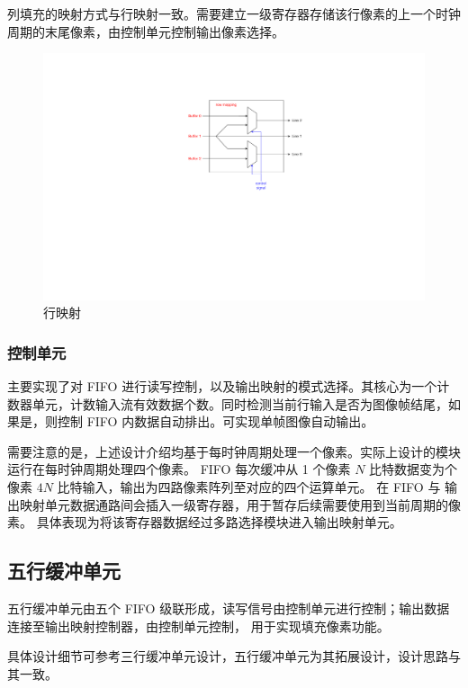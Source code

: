 \documentclass[12pt, a4paper, oneside]{ctexbook}
\begin{document}
	列填充的映射方式与行映射一致。需要建立一级寄存器存储该行像素的上一个时钟周期的末尾像素，由控制单元控制输出像素选择。
		\begin{figure}[h]
		\centering
		\includegraphics[scale=1]{pic/row_mapping.pdf}
		\caption{行映射}
		\end{figure}	
	\subsubsection{控制单元}
	主要实现了对 FIFO 进行读写控制，以及输出映射的模式选择。其核心为一个计数器单元，计数输入流有效数据个数。同时检测当前行输入是否为图像帧结尾，如果是，则控制 FIFO 内数据自动排出。可实现单帧图像自动输出。
	\par 需要注意的是，上述设计介绍均基于每时钟周期处理一个像素。实际上设计的模块运行在每时钟周期处理四个像素。
	FIFO 每次缓冲从 1 个像素 $N$ 比特数据变为个像素 $4N$ 比特输入，输出为四路像素阵列至对应的四个运算单元。
	在 FIFO 与 输出映射单元数据通路间会插入一级寄存器，用于暂存后续需要使用到当前周期的像素。
	具体表现为将该寄存器数据经过多路选择模块进入输出映射单元。
	\subsection{五行缓冲单元}
	五行缓冲单元由五个 FIFO 级联形成，读写信号由控制单元进行控制；输出数据连接至输出映射控制器，由控制单元控制，
	用于实现填充像素功能。\par 具体设计细节可参考三行缓冲单元设计，五行缓冲单元为其拓展设计，设计思路与其一致。
	
\end{document}
